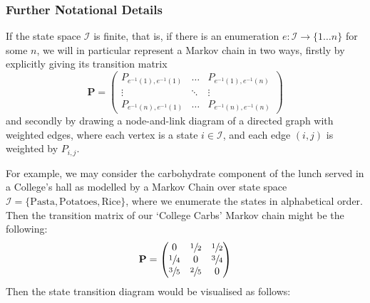 	\subsubsection{Further Notational Details}
		If the state space $\mathcal{I}$ is finite, that is, if there is an enumeration $e: \mathcal{I} 
		\rightarrow \{1\hdots n\}$ for some $n$, we will in particular represent a Markov chain in two 
		ways, firstly by explicitly giving its transition matrix 
		$$
			\mathbf{P} = 
			\begin{pmatrix}
				P_{e^{-1}(1),e^{-1}(1)} & \hdots & P_{e^{-1}(1), e^{-1}(n)} \\
				\vdots & \ddots & \vdots \\
				P_{e^{-1}(n),e^{-1}(1)} & \hdots & P_{e^{-1}(n), e^{-1}(n)}
			\end{pmatrix}
		$$
		and secondly by drawing a node-and-link diagram of a directed graph with weighted edges, where
		each vertex is a state $i \in \mathcal{I}$, and each edge $(i, j)$ is weighted by $P_{i,j}$. \par
		For example, we may consider the carbohydrate component of the lunch served in a College's hall
		as modelled by a Markov Chain over state space $\mathcal{I} = \{\mathrm{Pasta}, \mathrm{Potatoes},
		\mathrm{Rice}\}$, where we enumerate the states in alphabetical order. Then the transition matrix 
		of our `College Carbs' Markov chain might be the following:
		$$
			\mathbf{P} = 
			\begin{pmatrix}
				0 & \sfrac{1}{2} & \sfrac{1}{2} \\
				\sfrac{1}{4} & 0 & \sfrac{3}{4} \\
				\sfrac{3}{5} & \sfrac{2}{5} & 0 
			\end{pmatrix}
		$$
		Then the state transition diagram would be visualised as follows: \\
		\begin{center}
		\end{center}

